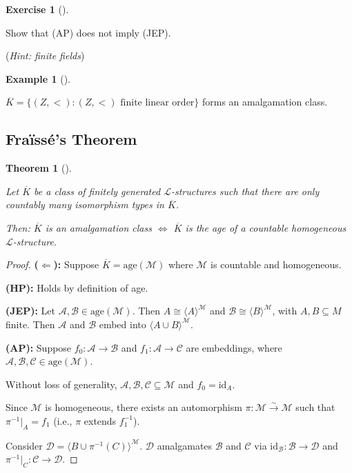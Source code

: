 \documentclass[
]{article}
\theoremstyle{definition}
\newtheorem{example}{Example}[section]
\theoremstyle{definition}
\newtheorem{exercise}{Exercise}[section]
\theoremstyle{plain}
\newtheorem{theorem}{Theorem}[section]
\theoremstyle{remark}
\begin{document}
\begin{exercise}[]\protect\hypertarget{exr-}{}\label{exr-}

\hfill\break
Show that (AP) does not imply (JEP).

(\emph{Hint: finite fields})

\end{exercise}

\begin{example}[]\protect\hypertarget{exm-}{}\label{exm-}

\hfill\break
\(\overline{K} = \{ (Z,<): (Z,<) \text{ finite linear order} \}\) forms
an amalgamation class.

\end{example}

\subsection{Fraïssé's Theorem}\label{frauxefssuxe9s-theorem}

\begin{theorem}[]\protect\hypertarget{thm-fraisse}{}\label{thm-fraisse}

Let \(\overline{K}\) be a class of finitely generated
\(\mathcal{L}\)-structures such that there are only countably many
isomorphism types in \(\overline{K}\).

Then: \(\overline{K}\) is an amalgamation class \(\Leftrightarrow\)
\(\overline{K}\) is the age of a countable homogeneous
\(\mathcal{L}\)-structure.

\end{theorem}

\begin{proof}
\textbf{(\(\Leftarrow\)):} Suppose
\(\overline{K} = \text{age}(\mathcal{M})\) where \(\mathcal{M}\) is
countable and homogeneous.

\textbf{(HP):} Holds by definition of age.

\textbf{(JEP):} Let
\(\mathcal{A}, \mathcal{B} \in \text{age}(\mathcal{M})\). Then
\(A \cong \langle A \rangle^{\mathcal{M}}\) and
\(\mathcal{B} \cong \langle B \rangle^{\mathcal{M}}\), with
\(A,B \subseteq M\) finite. Then \(\mathcal{A}\) and \(\mathcal{B}\)
embed into \(\langle A \cup B \rangle^{\mathcal{M}}\).

\textbf{(AP):} Suppose \(f_0: \mathcal{A} \to \mathcal{B}\) and
\(f_1: \mathcal{A} \to \mathcal{C}\) are embeddings, where
\(\mathcal{A}, \mathcal{B}, \mathcal{C} \in \text{age}(\mathcal{M})\).

Without loss of generality,
\(\mathcal{A}, \mathcal{B}, \mathcal{C} \subseteq \mathcal{M}\) and
\(f_0 = \text{id}_A\).

Since \(\mathcal{M}\) is homogeneous, there exists an automorphism
\(\pi: \mathcal{M} \overset{\sim}{\to} \mathcal{M}\) such that
\(\pi^{-1}|_A = f_1\) (i.e., \(\pi\) extends \(f_1^{-1}\)).

Consider
\(\mathcal{D} = \langle B \cup \pi^{-1}(C) \rangle^{\mathcal{M}}\).
\(\mathcal{D}\) amalgamates \(\mathcal{B}\) and \(\mathcal{C}\) via
\(\text{id}_{\mathcal{B}}: \mathcal{B} \to \mathcal{D}\) and
\(\pi^{-1}|_C: \mathcal{C} \to \mathcal{D}\).
\end{proof}
\end{document}
